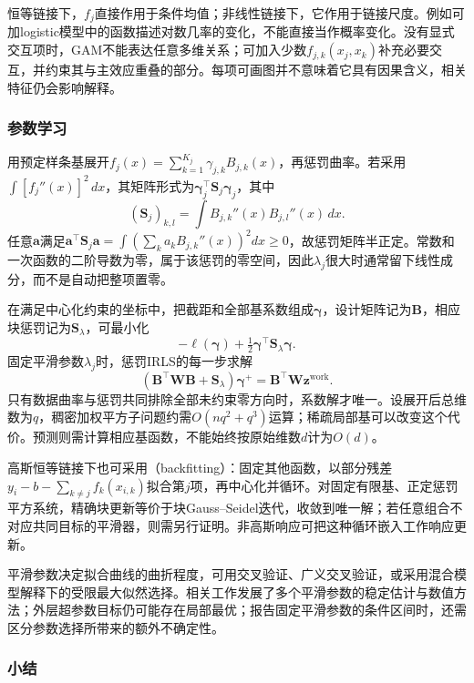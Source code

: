恒等链接下，$f_j$直接作用于条件均值；非线性链接下，它作用于链接尺度。例如可加logistic模型中的函数描述对数几率的变化，不能直接当作概率变化。没有显式交互项时，GAM不能表达任意多维关系；可加入少数$f_{j,k}(x_j,x_k)$补充必要交互，并约束其与主效应重叠的部分。每项可画图并不意味着它具有因果含义，相关特征仍会影响解释。

\subsubsection{参数学习}

用预定样条基展开$f_j(x)=\sum_{k=1}^{K_j}\gamma_{j,k}B_{j,k}(x)$，再惩罚曲率。若采用$\int[f_j''(x)]^2\,dx$，其矩阵形式为$\bm{\gamma}_j^{\top}\bm{S}_j\bm{\gamma}_j$，其中
\[
  (\bm{S}_j)_{k,l}=\int B_{j,k}''(x)B_{j,l}''(x)\,dx.
\]
任意$\bm{a}$满足$\bm{a}^{\top}\bm{S}_j\bm{a}=\int(\sum_k a_kB_{j,k}''(x))^2dx\geq0$，故惩罚矩阵半正定。常数和一次函数的二阶导数为零，属于该惩罚的零空间，因此$\lambda_j$很大时通常留下线性成分，而不是自动把整项置零。

在满足中心化约束的坐标中，把截距和全部基系数组成$\bm{\gamma}$，设计矩阵记为$\bm{B}$，相应块惩罚记为$\bm{S}_{\lambda}$，可最小化
\[
  -\ell(\bm{\gamma})+\tfrac12\bm{\gamma}^{\top}
       \bm{S}_{\lambda}\bm{\gamma}.
\]
固定平滑参数$\lambda_j$时，惩罚IRLS的每一步求解
\begin{equation}
  (\bm{B}^{\top}\bm{W}\bm{B}+\bm{S}_{\lambda})
       \bm{\gamma}^{+}
  =\bm{B}^{\top}\bm{W}\bm{z}^{\mathrm{work}}.
  \label{eq:regression-gam-irls}
\end{equation}
只有数据曲率与惩罚共同排除全部未约束零方向时，系数解才唯一。设展开后总维数为$q$，稠密加权平方子问题约需$O(nq^2+q^3)$运算；稀疏局部基可以改变这个代价。预测则需计算相应基函数，不能始终按原始维数$d$计为$O(d)$。

高斯恒等链接下也可采用（backfitting）：固定其他函数，以部分残差$y_i-b-\sum_{k\ne j}f_k(x_{i,k})$拟合第$j$项，再中心化并循环。对固定有限基、正定惩罚平方系统，精确块更新等价于块Gauss--Seidel迭代，收敛到唯一解；若任意组合不对应共同目标的平滑器，则需另行证明。非高斯响应可把这种循环嵌入工作响应更新。

平滑参数决定拟合曲线的曲折程度，可用交叉验证、广义交叉验证，或采用混合模型解释下的受限最大似然选择。相关工作发展了多个平滑参数的稳定估计与数值方法；外层超参数目标仍可能存在局部最优；报告固定平滑参数的条件区间时，还需区分参数选择所带来的额外不确定性。

\subsubsection{小结}

